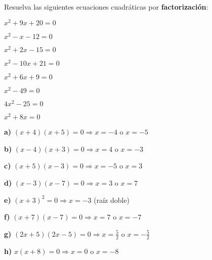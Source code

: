 \begin{exercise}
\problem Resuelva las siguientes ecuaciones cuadráticas por \textbf{factorización}:

\begin{exerciselist}
    \item $x^2 + 9x + 20 = 0$
    \item $x^2 - x - 12 = 0$
    \item $x^2 + 2x - 15 = 0$
    \item $x^2 - 10x + 21 = 0$
    \item $x^2 + 6x + 9 = 0$
    \item $x^2 - 49 = 0$
    \item $4x^2 - 25 = 0$
    \item $x^2 + 8x = 0$
\end{exerciselist}

\begin{solucion}
\textbf{a)} $(x + 4)(x + 5) = 0 \Rightarrow x = -4$ o $x = -5$

\textbf{b)} $(x - 4)(x + 3) = 0 \Rightarrow x = 4$ o $x = -3$

\textbf{c)} $(x + 5)(x - 3) = 0 \Rightarrow x = -5$ o $x = 3$

\textbf{d)} $(x - 3)(x - 7) = 0 \Rightarrow x = 3$ o $x = 7$

\textbf{e)} $(x + 3)^2 = 0 \Rightarrow x = -3$ (raíz doble)

\textbf{f)} $(x + 7)(x - 7) = 0 \Rightarrow x = 7$ o $x = -7$

\textbf{g)} $(2x + 5)(2x - 5) = 0 \Rightarrow x = \frac{5}{2}$ o $x = -\frac{5}{2}$

\textbf{h)} $x(x + 8) = 0 \Rightarrow x = 0$ o $x = -8$
\end{solucion}
\end{exercise}

